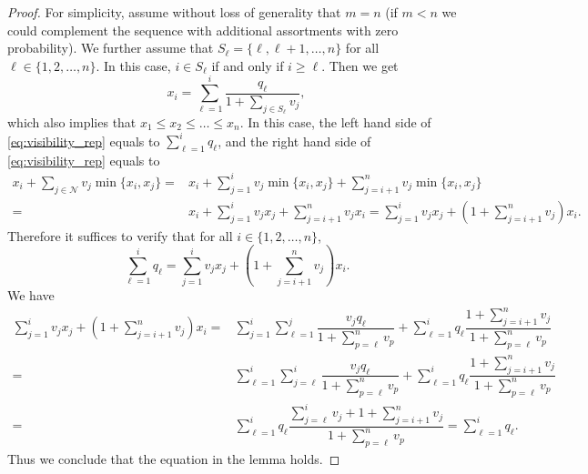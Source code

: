 \documentclass[msom,non-blindrev]{informs3} %
\theoremstyle{definition}
\begin{document}
\begin{proof}
 For simplicity, assume without loss of generality that $m=n$ (if $m<n$ we could complement the sequence with additional assortments with zero probability). We further assume that \mbox{$S_\ell=\{\ell,\ell+1,\dots,n\}$} for all $\ell\in\{1,2,\dots,n\}$. In this case, $i\in S_\ell$ if and only if $i\geq \ell$. Then we get
    \begin{equation*}
    x_i=\sum_{\ell=1}^i \dfrac{q_\ell}{1+\sum_{j\in S_\ell}v_j},
    \end{equation*}
    which also implies that $x_1\leq x_2\leq\dots\leq x_n$. In this case, the left hand side of \eqref{eq:visibility_rep} equals to $\sum_{\ell=1}^i q_\ell$, and the right hand side of \eqref{eq:visibility_rep} equals to
    \begin{align*}
    x_i+\sum_{j\in\mathcal{N}}v_j\min\{x_i,x_j\}=&x_i+\sum_{j=1}^i v_j \min\{x_i,x_j\}+\sum_{j=i+1}^n v_j \min\{x_i,x_j\}\\
    =&x_i+\sum_{j=1}^i v_jx_j+\sum_{j=i+1}^n v_jx_i=\sum_{j=1}^i v_jx_j+\left(1+\sum_{j=i+1}^n v_j\right)x_i.
    \end{align*}
    Therefore it suffices to verify that for all $i\in \{1,2,\dots,n\}$,
	\begin{equation*}
		\sum_{\ell=1}^i q_\ell=\sum_{j=1}^i v_jx_j+\left(1+\sum_{j=i+1}^n v_j\right)x_i.
	\end{equation*}
	We have
	\begin{align*}
		\sum_{j=1}^i v_jx_j+\left(1+\sum_{j=i+1}^n v_j\right)x_i=&\sum_{j=1}^i\sum_{\ell=1}^j \dfrac{v_j q_\ell}{1+\sum_{p=\ell}^n v_p} 
  + \sum_{\ell=1}^i q_\ell\dfrac{1+\sum_{j=i+1}^nv_j}{1+\sum_{p=\ell}^n v_p}         \\
=& \sum_{\ell=1}^i\sum_{j=\ell}^i \dfrac{v_j q_\ell}{1+\sum_{p=\ell}^n v_p} 
  + \sum_{\ell=1}^i q_\ell\dfrac{1+\sum_{j=i+1}^nv_j}{1+\sum_{p=\ell}^n v_p}         \\
  =& \sum_{\ell=1}^i q_\ell  \dfrac{\sum_{j=\ell}^i v_j + 1+\sum_{j=i+1}^nv_j }{1+\sum_{p=\ell}^n v_p} = \sum_{\ell=1}^i q_\ell.
%  
%  
	\end{align*}
    Thus we conclude that the equation in the lemma holds.
\end{proof}
\end{document}
